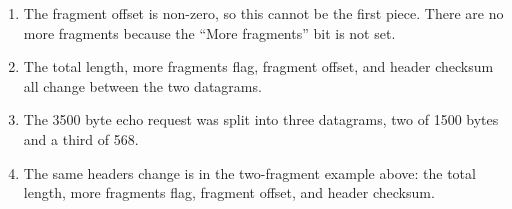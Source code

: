 \documentclass[11pt]{article}
\begin{document}
\begin{enumerate}
{\begin{verbatim}
\end{verbatim}
}

  \item The fragment offset is non-zero, so this cannot be the first piece.
        There are no more fragments because the ``More fragments'' bit is not
        set.

  \item The total length, more fragments flag, fragment offset, and header
        checksum all change between the two datagrams.

  \item The 3500 byte echo request was split into three datagrams, two of 1500
        bytes and a third of 568.

  \item The same headers change is in the two-fragment example above: the total
        length, more fragments flag, fragment offset, and header checksum.

\end{enumerate}
\end{document}
